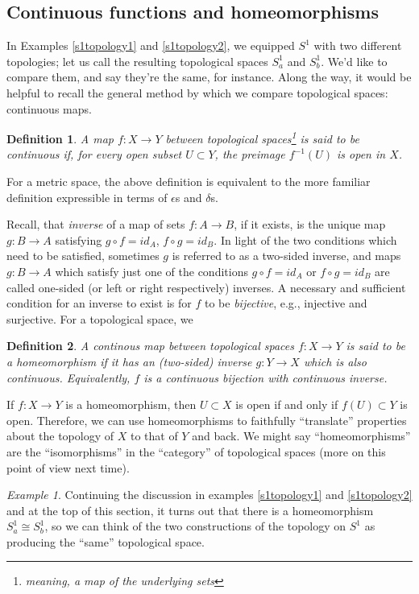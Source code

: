 \documentclass[11pt]{article}
\newtheorem{defn}{Definition}
\theoremstyle{remark}
\newtheorem{ex}{Example}
\begin{document}
\subsection*{Continuous functions and homeomorphisms}

In Examples \ref{s1topology1} and \ref{s1topology2}, we equipped $S^1$ with two
different topologies; let us call the resulting topological spaces $S^1_{a}$
and $S^1_b$. We'd like to compare them, and say they're the same, for instance.
Along the way, it would be helpful to recall the general method by which we
compare topological spaces: continuous maps.

\begin{defn}
    A map $f: X \rightarrow Y$ between topological spaces\footnote{meaning, a map of the underlying sets} is said to be {\em continuous} if, for every open subset $U \subset Y$, the preimage $f^{-1}(U)$ is open in $X$.
\end{defn}
For a metric space, the above definition is equivalent to the more familiar
definition expressible in terms of $\epsilon$s and $\delta$s.

Recall, that {\em inverse} of a map of sets $f: A \rightarrow B$, if it exists,
is the unique map $g: B \rightarrow A$ satisfying $g\circ f = id_{A}$, $f \circ
g = id_{B}$. In light of the two conditions which need to be satisfied,
sometimes $g$ is referred to as a two-sided inverse, and maps $g: B \rightarrow
A$ which satisfy just one of the conditions $g \circ f = id_{A}$ or $f \circ g
= id_B$ are called one-sided (or left or right respectively) inverses. A
necessary and sufficient condition for an inverse to exist is for $f$ to be
{\em bijective}, e.g., injective and surjective. For a topological space, we 

\begin{defn} 
    A {\em continous map} between topological spaces $f: X \rightarrow
    Y$ is said to be a {\em homeomorphism} if it has an (two-sided) inverse $g:
    Y \rightarrow X$ which is also continuous. Equivalently, $f$ is a
    continuous bijection with continuous inverse.
\end{defn} 
If $f: X \rightarrow Y$ is a homeomorphism, then $U \subset X$ is
open if and only if $f(U) \subset Y$ is open. Therefore, we can use
homeomorphisms to faithfully ``translate'' properties about the topology of $X$
to that of $Y$ and back. We might say ``homeomorphisms'' are the
``isomorphisms'' in the ``category'' of topological spaces (more on this point
of view next time). 

\begin{ex}
Continuing the discussion in examples \ref{s1topology1} and \ref{s1topology2}
and at the top of this section, it turns out that there is a homeomorphism
$S^1_a \cong S^1_b$, so we can think of the two constructions of the topology
on $S^1$ as producing the ``same'' topological space.  \end{ex}
\end{document}
